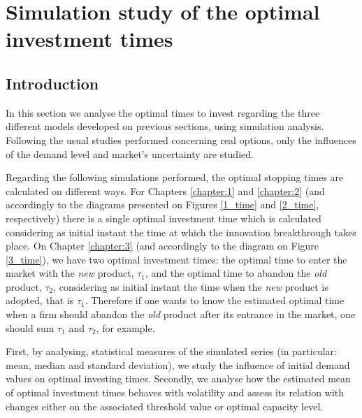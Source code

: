 \chapter{%
Simulation study of the optimal investment times}
\label{chapter:stoptime}



\section{Introduction}
\label{section:stoptime_intro}

In this section we analyse the optimal times to invest regarding the three different models developed on previous sections, using simulation analysis. Following the usual studies performed concerning real options, only the influences of the demand level and market's uncertainty are studied.

Regarding the following simulations performed, the optimal stopping times are calculated on different ways.
For Chapters \ref{chapter:1} and \ref{chapter:2} (and accordingly to the diagrams presented on Figures \ref{1_time} and \ref{2_time}, respectively) there is a single optimal investment time which is calculated considering as initial instant the time at which the innovation breakthrough takes place.
On Chapter \ref{chapter:3} (and accordingly to the diagram on Figure \ref{3_time}), we have two optimal investment times: the optimal time to enter the market with the \textit{new} product, $\tau_1$, and the optimal time to abandon the \textit{old} product, $\tau_2$, considering as initial instant the time when the \textit{new} product is adopted, that is $\tau_1$. Therefore if one wants to know the estimated optimal time when a firm should abandon the \textit{old} product after its entrance in the market, one should sum $\tau_1$ and $\tau_2$, for example.


First, by analysing, statistical measures of the simulated series (in particular: mean, median and standard deviation), we study the influence of initial demand values on optimal investing times.
Secondly, we analyse how the estimated mean of optimal investment times behaves with volatility and assess its relation with changes  either on the associated threshold value or optimal capacity level.

